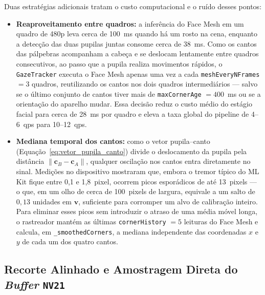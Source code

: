 Duas estratégias adicionais tratam o custo computacional e o ruído desses pontos:
\begin{itemize}
    \item \textbf{Reaproveitamento entre quadros:} a inferência do Face Mesh em um quadro de 480p leva cerca de 100~ms quando há um rosto na cena, enquanto a detecção das duas pupilas juntas consome cerca de 38~ms. Como os cantos das pálpebras acompanham a cabeça e se deslocam lentamente entre quadros consecutivos, ao passo que a pupila realiza movimentos rápidos, o \texttt{GazeTracker} executa o Face Mesh apenas uma vez a cada \texttt{meshEveryNFrames} $= 3$ quadros, reutilizando os cantos nos dois quadros intermediários --- salvo se o último conjunto de cantos tiver mais de \texttt{maxCornerAge} $= 400$~ms ou se a orientação do aparelho mudar. Essa decisão reduz o custo médio do estágio facial para cerca de 28~ms por quadro e eleva a taxa global do pipeline de 4--6~qps para 10--12~qps.
    \item \textbf{Mediana temporal dos cantos:} como o vetor pupila--canto (Equação~\ref{eq:vetor_pupila_canto}) divide o deslocamento da pupila pela distância $\lVert \mathbf{c}_B - \mathbf{c}_A \rVert$, qualquer oscilação nos cantos entra diretamente no sinal. Medições no dispositivo mostraram que, embora o tremor típico do ML Kit fique entre 0,1 e 1,8~pixel, ocorrem picos esporádicos de até 13~pixels --- o que, em um olho de cerca de 100~pixels de largura, equivale a um salto de $0{,}13$ unidades em $\mathbf{v}$, suficiente para corromper um alvo de calibração inteiro. Para eliminar esses picos sem introduzir o atraso de uma média móvel longa, o rastreador mantém as últimas \texttt{cornerHistory} $= 5$ leituras do Face Mesh e calcula, em \texttt{\_smoothedCorners}, a mediana independente das coordenadas $x$ e $y$ de cada um dos quatro cantos.
\end{itemize}

\subsection{Recorte Alinhado e Amostragem Direta do \textit{Buffer} \texttt{NV21}} \label{sec:met_recorte}

